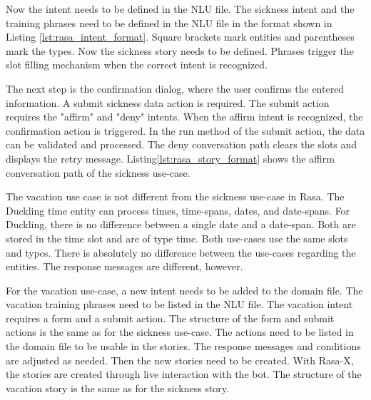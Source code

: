 Now the intent needs to be defined in the NLU file.
The sickness intent and the training phrases need to be defined in the 
NLU  file in the format shown in Listing \ref{lst:rasa_intent_format}.
Square brackets mark entities and parentheses mark the types.
Now the sickness story needs to be defined.
Phrases trigger the slot filling mechanism when the correct intent is recognized.

The next step is the confirmation dialog, where the user confirms the entered information.
A submit sickness data action is required.
The submit action requires the "affirm" and "deny" intents.
When the affirm intent is recognized, the confirmation action is triggered.
In the run method of the submit action, the data can be validated and processed.
The deny conversation path clears the slots and displays the retry message.
Listing\ref{lst:rasa_story_format} shows the affirm conversation path of the sickness use-case.

The vacation use case is not different from the sickness use-case in Rasa.
The Duckling time entity can process times, time-spans, dates, and date-spans.
For Duckling, there is no difference between a single date and a date-span.
Both are stored in the time slot and are of type time.
Both use-cases use the same slots and types.
There is absolutely no difference between the use-cases regarding the entities.
The response messages are different, however.

For the vacation use-case, a new intent needs to be added to the domain file.
The vacation training phrases need to be listed in the NLU file.
The vacation intent requires a form and a submit action.
The structure of the form and submit actions is the same as for the sickness use-case.
The actions need to be listed in the domain file to be usable in the stories.
The response messages and conditions are adjusted as needed.
Then the new stories need to be created.
With Rasa-X, the stories are created through live interaction with the bot.
The structure of the vacation story is the same as for the sickness story.

